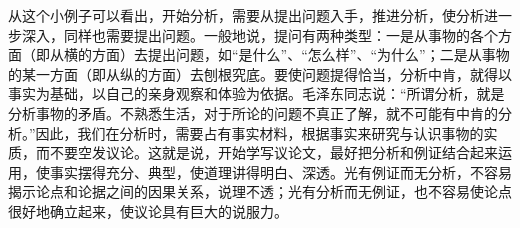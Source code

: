 从这个小例子可以看出，开始分析，需要从提出问题入手，推进分析，使分析进一步深入，同样也需要提出问题。一般地说，提问有两种类型：一是从事物的各个方面（即从横的方面）去提出问题，如“是什么”、“怎么样”、“为什么”；二是从事物的某一方面（即从纵的方面）去刨根究底。要使问题提得恰当，分析中肯，就得以事实为基础，以自己的亲身观察和体验为依据。毛泽东同志说：“所谓分析，就是分析事物的矛盾。不熟悉生活，对于所论的问题不真正了解，就不可能有中肯的分析。”因此，我们在分析时，需要占有事实材料，根据事实来研究与认识事物的实质，而不要空发议论。这就是说，开始学写议论文，最好把分析和例证结合起来运用，使事实摆得充分、典型，使道理讲得明白、深透。光有例证而无分析，不容易揭示论点和论据之间的因果关系，说理不透；光有分析而无例证，也不容易使论点很好地确立起来，使议论具有巨大的说服力。
\newpage